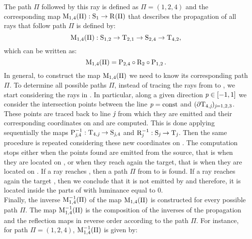  The path $\Pi$ followed by this ray is defined as $\Pi =(1, 2, 4)$ and
the corresponding map $\mathrm{M}_{1,4}(\Pi):\mbox{$\textup{S}_{\textit{$1$}}$}\rightarrow \mbox{$\textup{R}_{\textit{}}$}(\Pi)$ that describes the propagation of all rays that follow path $\Pi$ is defined by:
\begin{equation}
\label{map_example}
\mathrm{M}_{1,4}(\Pi):\mbox{$\textup{S}_{\textit{$1$,$2$}}$}\rightarrow \mbox{$\textup{T}_{\textit{$2$,$1$}}$}\rightarrow\mbox{$\textup{S}_{\textit{$2$,$4$}}$}\rightarrow \mbox{$\textup{T}_{\textit{$4$,$2$}}$},
\end{equation} which can be written as:
\begin{equation}
\mathrm{M}_{1,4}(\Pi) = \mathrm{P}_{2,4}
\circ \mathrm{R}_{2}\circ \mathrm{P}_{1,2}\,.
\end{equation}
In general, to construct the map $\mathrm{M}_{1,4}(\Pi)$ we need to know its corresponding path $\Pi$.
To determine all possible paths $\Pi$,
instead of tracing the rays from  to , we start considering the rays in .
In particular, along a given direction $\textit{p}\in[-1,1]$ we consider the intersection points between the line $\textit{p}=\mbox{const}$ and $(\partial\mbox{$\textup{T}_{\textit{$4$,\textit{j}}}$})_{\textit{j}=1, 2, 3}$. These points are traced back to line $\textit{j}$ from which they are emitted and their corresponding coordinates on  and  are computed. This is done applying sequentially the maps $\mathrm{P}_{{\textit{j},4}}^{-1}:\mbox{$\textup{T}_{\textit{$4$,\textit{j}}}$}\rightarrow\mbox{$\textup{S}_{\textit{\textit{j},$4$}}$}$ and $\mathrm{R}_{{\textit{j}}}^{-1}:\mbox{$\textup{S}_{\textit{\textit{j}}}$}\rightarrow\mbox{$\textup{T}_{\textit{\textit{j}}}$}$.
Then the same procedure is repeated considering these new coordinates on .
The computation stops either when the points found are emitted from the source, that is when they are located on , or when they reach again the target, that is when they are located on .
If a ray reaches , then a path $\Pi$ from  to  is found.
If a ray reaches again the target , then we conclude that it is not emitted by
 and therefore, it is located inside the parts of  with luminance equal to $0$. \\ \indent
 Finally, the inverse $\mathrm{M}_{{1,4}}^{-1}(\Pi)$ of the map $\mathrm{M}_{1,4}(\Pi)$ is constructed for every possible path $\Pi$.
 The map $\mathrm{M}_{{1,4}}^{-1}(\Pi)$ is the composition of the inverses of the propagation and the reflection maps in reverse order according to the path $\Pi$.
For instance, for path $\Pi = (1,2,4)$, $\mathrm{M}_{{1,4}}^{-1}(\Pi)$ is given by:
